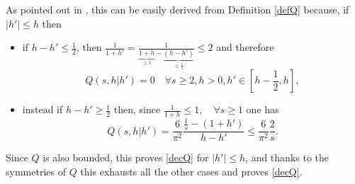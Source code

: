 \documentclass[a4paper,10pt,reqno]{amsart}
\numberwithin{equation}{subsection}
\numberwithin{figure}{subsection}
\begin{document}
As pointed out in \cite{CG2010,MS2008d2}, this can be easily derived from Definition \ref{defQ} because, if $|h'|\leq h$ then
\begin{itemize}
\item if $h-h'\leq\frac{1}{2}$, then $\frac{1}{1+h'}=\frac{1}{\underbrace{1+h}_{\geq1}-\underbrace{(h-h')}_{\leq\frac{1}{2}}}\leq 2$ and therefore
\[
Q(s,h|h')=0\quad\forall s\geq2,h>0,h'\in[h-\frac{1}{2},h],
\]
\item instead if $h-h'\geq\frac{1}{2}$ then, since $\frac{1}{1+h}\leq1,\quad\forall s\geq1$ one has
\[
Q(s,h|h')=\frac{6}{\pi^2}\frac{\frac{1}{s}-(1+h')}{h-h'}\leq\frac{6}{\pi^2}\frac{2}{s}.
\]
\end{itemize}
Since $Q$ is also bounded, this proves \eqref{decQ} for $|h'|\leq h$, and thanks to the symmetries of $Q$ this exhausts all the other cases and proves \eqref{decQ}.
\end{document}
